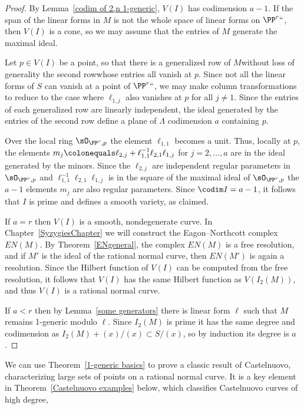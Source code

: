 \begin{proof}  By Lemma~\ref{codim of 2,n 1-generic},  $V(I)$ has
codimension $a-1$.
If the span of the linear forms in $M$ is not the whole space of linear
forms on $\PP^r` `$, then $V(I)$ is a cone,
so we may assume that the entries of $M$ generate the maximal ideal.

Let $p\in V(I)$ be a point, so that there is a generalized row of
$M$\emdash without loss of generality the second row\emdash whose
entries all vanish
at $p$. Since not all the linear forms
of $S$ can vanish at a point of $\PP^r` `$, we may make column
transformations to reduce to the case where
$\ell_{1,j}$ also vanishes at $p$ for all $j\neq 1$. Since the entries
of each generalized row are linearly independent, the ideal generated
by the entries of the second row define a plane of
$\Lambda$ codimension $a$ containing $p$.

Over the local ring $\sO_{\PP^r, p}$ the element $\ell_{1,1}$ becomes
a unit.
Thus, locally at $p$, the elements $m_{j}\colonequals  \ell_{2,j}+
\ell_{1,1}^{-1}\ell_{2,1}\ell_{1,j}$ for $j=2,\dots, a$ are in the
ideal generated
by the minors. Since the $\ell_{2,j}$ are independent regular parameters
in $\sO_{\PP^r, p}$ and
$\ell_{1,1}^{-1}\ell_{2,1}\ell_{1,j}$ is in the square of the maximal
ideal of $\sO_{\PP^r, p}$ the
$a-1$ elements $m_{j}$
are also regular parameters. Since $\codim I = a-1$, it follows that $I$
is prime and defines a smooth variety, as claimed.

If $a=r$ then $V(I)$ is a smooth, nondegenerate curve. In
Chapter~\ref{SyzygiesChapter} we will construct the Eagon--Northcott
complex $EN(M)$. By Theorem~\ref{ENgeneral}, the complex $EN(M)$ is a
free resolution,
and if $M'$ is the ideal of the rational normal curve, then $EN(M')$
is again a resolution. Since the Hilbert
function of $V(I)$ can be computed from the free resolution, it follows
that $V(I)$ has the same Hilbert function
as $V(I_2(M))$, and thus $V(I)$ is a rational normal curve.

If $a<r$ then by Lemma~\ref{some generators} there is linear form $\ell$
such that $M$ remains 1-generic modulo $\ell$.
Since $I_2(M)$ is prime it has the same degree and codimension as $I_2(M)
+(x)/(x) \subset S/(x)$, so by induction its degree
is $a$.
\end{proof}

We can use Theorem~\ref{1-generic basics} to prove a classic result of
Castelnuovo, characterizing large sets of
%
points on a rational normal curve. It is a key element in
Theorem~\ref{Castelnuovo examples} below, which classifies
Castelnuovo curves of high
degree, 

